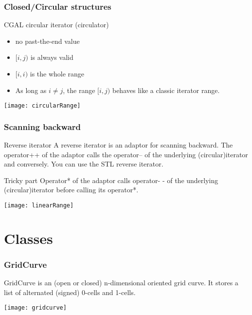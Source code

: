 \begin{frame}
  \frametitle{Closed/Circular structures}

  \begin{block}{CGAL circular iterator (circulator)}
\begin{itemize}
  \item no past-the-end value
  \item $[i,j)$ is always valid
  \item $[i,i)$ is the whole range
  \item As long as $i \neq j$, the range $[i,j)$ behaves like a classic iterator range. 
\end{itemize}
  \end{block}

 \begin{center}
   \texttt{[image: circularRange]}
 \end{center}

\end{frame}

\begin{frame}
  \frametitle{Scanning backward}

  \begin{block}{Reverse iterator}
A reverse iterator is an adaptor for scanning backward. The operator++ of the adaptor calls the operator-- of the underlying (circular)iterator and conversely. You can use the STL reverse iterator.
  \end{block}

  \begin{block}{Tricky part}
Operator* of the adaptor calls operator- - of the underlying (circular)iterator before calling its operator*.
  \end{block}

 \begin{center}
   \texttt{[image: linearRange]}
 \end{center}

\end{frame}


\section{Classes}

\begin{frame}
  \frametitle{GridCurve}

  \begin{block}{}
GridCurve is an (open or closed) n-dimensional oriented grid curve. It stores a list of alternated (signed) 0-cells and 1-cells. 
  \end{block}

 \begin{center}
   \texttt{[image: gridcurve]}
 \end{center}

\end{frame}

